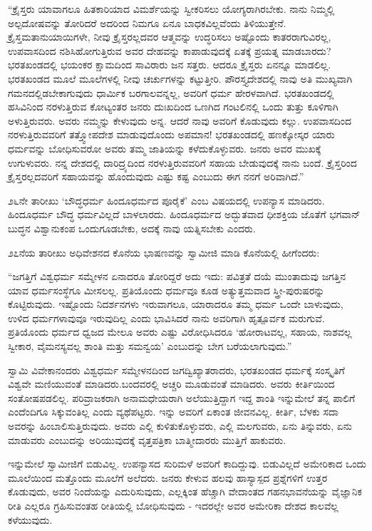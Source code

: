  “ಕ್ರೈಸ್ತರು ಯಾವಾಗಲೂ ಹಿತಕಾರಿಯಾದ ವಿಮರ್ಶೆಯನ್ನು ಸ್ವೀಕರಿಸಲು ಯೋಗ್ಯರಾಗಿರಬೇಕು. ನಾನು ನಿಮ್ಮಲ್ಲಿ ಅಲ್ಪದೋಷವನ್ನು ತೋರಿದರೆ ಅದರಿಂದ ನಿಮಗೂ ಏನೂ ಬಾಧಕವಿಲ್ಲವೆಂದು ತಿಳಿಯುತ್ತೇನೆ. ಕ್ರೈಸ್ತಮತಾನುಯಾಯಿಗಳೇ, ನೀವು ಕ್ರೈಸ್ತರಲ್ಲದವರ ಆತ್ಮವನ್ನು ಉದ್ಧರಿಸಲು ಅಷ್ಟೊಂದು ಕಾತರರಾಗುವಿರಲ್ಲ, ಉಪವಾಸದಿಂದ ನಶಿಸಿಹೋಗುತ್ತಿರುವ ಅವರ ದೇಹವನ್ನು ಕಾಪಾಡುವುದಕ್ಕೆ ಏತಕ್ಕೆ ಪ್ರಯತ್ನ ಮಾಡಬಾರದು? ಭರತಖಂಡದಲ್ಲಿ ಭಯಂಕರ ಕ್ಷಾಮದಿಂದ ಸಾವಿರಾರು ಜನ ಸತ್ತರು. ಆದರೂ ಕ್ರೈಸ್ತರು ಏನನ್ನೂ ಮಾಡಲಿಲ್ಲ. ಭರತಖಂಡದ ಮೂಲೆ ಮೂಲೆಗಳಲ್ಲಿ ನೀವು ಚರ್ಚುಗಳನ್ನು ಕಟ್ಟುತ್ತೀರಿ. ಪೌರಸ್ತ್ಯದೇಶದಲ್ಲಿ ನಾವು ಅತಿ ಮುಖ್ಯವಾಗಿ ಗಮನದಲ್ಲಿಡಬೇಕಾಗುವುದು ಧಾರ್ಮಿಕ ಬರಗಾಲವನ್ನಲ್ಲ, ಅವರಿಗೆ ಧರ್ಮ ಹೇರಳವಾಗಿದೆ. ಭರತಖಂಡದಲ್ಲಿ ಹಸಿವಿನಿಂದ ನರಳುತ್ತಿರುವ ಕೋಟ್ಯಂತರ ಜನರು ದುಃಖದಿಂದ ಒಣಗಿದ ಗಂಟಲಿನಲ್ಲಿ ಒಂದು ತುತ್ತು ಕೂಳಿಗಾಗಿ ಅಳುತ್ತಿರುವರು. ಅವರು ನಮ್ಮನ್ನು ಕೇಳುವುದು ಅನ್ನ. ಆದರೆ ನಾವು ಅವರಿಗೆ ಕೊಡುವುದು ಕಲ್ಲು. ಉಪವಾಸದಿಂದ ನರಳುತ್ತಿರುವವರಿಗೆ ತತ್ತ್ವೋಪದೇಶ ಮಾಡುವುದೊಂದು ಅಪಮಾನ! ಭರತಖಂಡದಲ್ಲಿ ಹಣಕ್ಕೋಸ್ಕರ ಯಾರು ಧರ್ಮವನ್ನು ಬೋಧಿಸುವರೋ ಅವರು ತಮ್ಮ ಜಾತಿಯನ್ನು ಕಳೆದುಕೊಳ್ಳುವರು. ಜನರು ಅವರ ಮುಖಕ್ಕೆ ಉಗುಳುವರು. ನನ್ನ ದೇಶದಲ್ಲಿ ದಾರಿದ್ರ್ಯದಿಂದ ನರಳುತ್ತಿರುವವರಿಗೆ ಸಹಾಯ ಬೇಡುವುದಕ್ಕೆ ನಾನು ಬಂದೆ. ಕ್ರೈಸ್ತರಿಂದ ಕ್ರೈಸ್ತರಲ್ಲದವರಿಗೆ ಸಹಾಯವನ್ನು ಹೊಂದುವುದು ಎಷ್ಟು ಕಷ್ಟ ಎಂಬುದು ಈಗ ನನಗೆ ಅರಿವಾಗಿದೆ.” 

 ೨೬ನೇ ತಾರೀಖು ‘ಬೌದ್ಧಧರ್ಮ ಹಿಂದೂಧರ್ಮದ ಪೂರೈಕೆ’ ಎಂಬ ವಿಷಯದಲ್ಲಿ ಉಪನ್ಯಾಸ ಮಾಡಿದರು. ಹಿಂದೂಧರ್ಮ ಬೌದ್ಧ ಧರ್ಮವಿಲ್ಲದೆ ಬಾಳಲಾರದು. ಹಿಂದೂಧರ್ಮದ ಅದ್ಭುತವಾದ ಧೀಶಕ್ತಿಯ ಜೊತೆಗೆ ಭಗವಾನ್ ಬುದ್ಧನ ವಿಶ್ವಾನುಕಂಪ ಒಂದುಗೂಡಬೇಕು, ಅದಕ್ಕೆ ನಾವು ಯತ್ನಿಸಬೇಕು ಎಂದರು. 

 ೨೭ನೆಯ ತಾರೀಖು ಅಧಿವೇಶನದ ಕೊನೆಯ ಭಾಷಣವನ್ನು ಸ್ವಾಮೀಜಿ ಮಾಡಿ ಕೊನೆಯಲ್ಲಿ ಹೀಗೆಂದರು: 

 “ಜಗತ್ತಿಗೆ ವಿಶ್ವಧರ್ಮ ಸಮ್ಮೇಳನ ಏನಾದರೂ ತೋರಿದ್ದರೆ ಅದು ಇದು: ಪವಿತ್ರತೆ ದಯೆ ಮುಂತಾದುವು ಜಗತ್ತಿನ ಯಾವ ಧರ್ಮಸಂಸ್ಥೆಗೂ ಮೀಸಲಲ್ಲ. ಪ್ರತಿಯೊಂದು ಧರ್ಮವೂ ಕೂಡ ಅತ್ಯುತ್ತಮವಾದ ಸ್ತ್ರೀ-ಪುರುಷರನ್ನು ಕೊಟ್ಟಿರುವುದು. ಇಷ್ಟೊಂದು ನಿದರ್ಶನಗಳು ಇರುವಾಗಲೂ, ಯಾರಾದರೂ ತಮ್ಮ ಧರ್ಮ ಒಂದೇ ಬಾಳುವುದು, ಉಳಿದ ಧರ್ಮಗಳಾವುವೂ ಇರುವುದಿಲ್ಲ ಎಂದು ಭಾವಿಸಿದರೆ ನಾನು ಅವರಿಗಾಗಿ ಹೃತ್ಪೂರ್ವಕ ಮರುಗುವೆ. ಪ್ರತಿಯೊಂದು ಧರ್ಮದ ಧ್ವಜದ ಮೇಲೂ ಅವರು ಎಷ್ಟು ವಿರೋಧಿಸಿದರೂ ‘ಹೋರಾಟವಲ್ಲ, ಸಹಾಯ, ನಾಶವಲ್ಲ ಸ್ವೀಕಾರ, ವೈಮನಸ್ಯವಲ್ಲ ಶಾಂತಿ ಮತ್ತು ಸಮನ್ವಯ’ ಎಂಬುದನ್ನು ಬೇಗ ಬರೆಯಲಾಗುವುದು.” 

 ಸ್ವಾಮಿ ವಿವೇಕಾನಂದರು ವಿಶ್ವಧರ್ಮ ಸಮ್ಮೇಳನದಿಂದ ಜಗದ್ವಿಖ್ಯಾತರಾದರು, ಭರತಖಂಡದ ಧರ್ಮಕ್ಕೆ ಸಂಸ್ಕೃತಿಗೆ ವಿಶ್ವವೇ ಮಣಿಯುವಂತೆ ಮಾಡಿದರು.\break ಬಂದವರಲ್ಲಿ ಅಚ್ಚರಿ ಮೂಡುವಂತೆ ಮಾಡಿದರು. ಅವರು ಕೀರ್ತಿಯಿಂದ ಸಂತೋಷಪಡಲಿಲ್ಲ. ಪರಿವ್ರಾಜಕರಾಗಿ ಅನಾಮಧೇಯರಾಗಿ ಅಲೆಯುತ್ತಿದ್ದಾಗ ಇದ್ದ ಶಾಂತಿ ಇನ್ನುಮೇಲೆ ತನ್ನ ಪಾಲಿಗೆ ಎಂದೆಂದಿಗೂ ಸಿಕ್ಕುವಂತಿಲ್ಲ ಎಂದು ವ್ಯಥೆಪಟ್ಟರು. ಇನ್ನು ಅವರಿಗೆ ಏಕಾಂತ ಜೀವನವಿಲ್ಲ. ಕೀರ್ತಿ, ಬೆಳಕು ಸದಾ ಅವರನ್ನು ಹಿಂಬಾಲಿಸುತ್ತಿರುವುದು. ಅವರು ಎಲ್ಲಿ ಕುಳಿತುಕೊಳ್ಳುವರು, ಎಲ್ಲಿ ಮಲಗುವರು, ಏನು ತಿನ್ನುವರು, ಏನು ಮಾಡುವರು ಎಂಬುದನ್ನು ಅರಿಯುವುದಕ್ಕೆ ವೃತ್ತಪತ್ರಿಕಾ ಬಾತ್ಮೀದಾರರು ಮುತ್ತಿಗೆ ಹಾಕುವರು. 

 ಇನ್ನುಮೇಲೆ ಸ್ವಾಮೀಜಿಗೆ ಬಿಡುವಿಲ್ಲ. ಉಪನ್ಯಾಸದ ಸುರಿಮಳೆ ಅವರಿಗೆ ಕಾದಿದ್ದುವು. ಬಿಡುವಿಲ್ಲದೆ ಅಮೇರಿಕಾದ ಒಂದು ಮೂಲೆಯಿಂದ ಮತ್ತೊಂದು ಮೂಲೆಗೆ ಅಲೆದರು. ಜನರು ಕೇಳುವ ಹಲವು ಹಾಸ್ಯಾಸ್ಪದ ಪ್ರಶ್ನೆಗಳಿಗೆ ಉತ್ತರ ಕೊಡುವುದು, ಅವರ ನಿಂದೆಯನ್ನು ಎದುರಿಸುವುದು, ಎಲ್ಲಕ್ಕಿಂತ ಹೆಚ್ಚಾಗಿ ವೇದಾಂತದ ಗಹನಭಾವನೆಯನ್ನು ವೈಜ್ಞಾನಿಕ ರೀತಿ ಎಲ್ಲರೂ ಗ್ರಹಿಸುವಂತಹ ರೀತಿಯಲ್ಲಿ ಬೋಧಿಸುವುದು - ಇದರಲ್ಲೇ ಅವರ ಅಮೇರಿಕಾ ದೇಶದ ಕಾಲವೆಲ್ಲ ಕಳೆಯುವುದು. 

